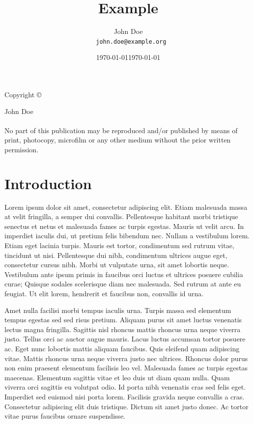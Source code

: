 \documentclass[epsf,a4paper]{book}
\begin{document}
\frontmatter
\title{Example}
\author{John Doe\\
  \texttt{john.doe@example.org}}
\date{\today}
\maketitle

\vspace*{\fill}
\noindent
Copyright \copyright\space \date{\today} John Doe \\ \\
\noindent
No part of this publication may be reproduced and/or published by means
of print, photocopy, microfilm or any other medium without the prior
written permission.

\tableofcontents
\listoffigures
\listoftables

\chapter{Introduction}

Lorem ipsum dolor\cite{JS2015} sit amet, consectetur adipiscing\cite{rfc2119} elit. Etiam malesuada massa at velit fringilla, a semper dui convallis. Pellentesque habitant morbi tristique senectus et netus et malesuada fames ac turpis egestas. Mauris ut velit arcu. In imperdiet iaculis dui, ut pretium felis bibendum nec. Nullam a vestibulum lorem. Etiam eget lacinia turpis. Mauris est tortor, condimentum sed rutrum vitae, tincidunt ut nisi. Pellentesque dui nibh, condimentum ultrices augue eget, consectetur cursus nibh. Morbi ut vulputate urna, sit amet lobortis neque. Vestibulum ante ipsum primis in faucibus orci luctus et ultrices posuere cubilia curae; Quisque sodales scelerisque diam nec malesuada. Sed rutrum at ante eu feugiat. Ut elit lorem, hendrerit et faucibus non, convallis id urna.

Amet nulla facilisi morbi tempus iaculis urna. Turpis massa sed elementum tempus egestas sed sed risus pretium. Aliquam purus sit amet luctus venenatis lectus magna fringilla. Sagittis nisl rhoncus mattis rhoncus urna neque viverra justo. Tellus orci ac auctor augue mauris. Lacus luctus accumsan tortor posuere ac. Eget nunc lobortis mattis aliquam faucibus. Quis eleifend quam adipiscing vitae. Mattis rhoncus urna neque viverra justo nec ultrices. Rhoncus dolor purus non enim praesent elementum facilisis leo vel. Malesuada fames ac turpis egestas maecenas. Elementum sagittis vitae et leo duis ut diam quam nulla. Quam viverra orci sagittis eu volutpat odio. Id porta nibh venenatis cras sed felis eget. Imperdiet sed euismod nisi porta lorem. Facilisis gravida neque convallis a cras. Consectetur adipiscing elit duis tristique. Dictum sit amet justo donec. Ac tortor vitae purus faucibus ornare suspendisse.
\end{document}
